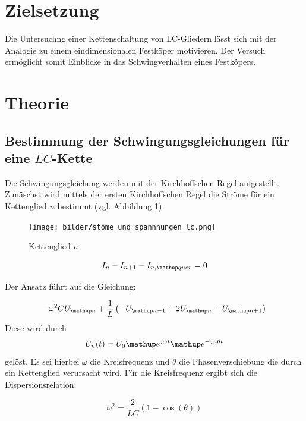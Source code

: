 \setcounter{page}{1}
\section*{Zielsetzung}
Die Untersuchng einer Kettenschaltung von LC-Gliedern lässt sich mit der Analogie  
zu einem eindimensionalen Festköper motivieren.
Der Versuch ermöglicht somit Einblicke in das Schwingverhalten eines 
Festköpers.

\section{Theorie}

\subsection{Bestimmung der Schwingungsgleichungen für eine $LC$-Kette}
Die Schwingungsgleichung werden mit der Kirchhoffschen Regel aufgestellt.
Zunäschst wird mittels der ersten Kirchhoffschen Regel die Ströme für ein Kettenglied $n$ 
bestimmt (vgl. Abbildung \ref{fig:kettenglied}):

\begin{figure}
  \centering
  \texttt{[image: bilder/stöme\_und\_spannnungen\_lc.png]}
  \caption{Kettenglied $n$}
  \label{fig:kettenglied}
\end{figure}

\begin{equation}
\label{eq:kircheins_lc}
I_n-I_{n+1}-I_{n,\map{quer}}=0
\end{equation}

Der Ansatz führt auf die Gleichung:

\begin{equation}
\label{eq:gleichung_lc}
-\omega^2CU\ua{n}+\frac{1}{L}\left(-U\ua{n-1}+2U\ua{n}-U\ua{n+1}\right)
\end{equation}
Diese wird durch 
\begin{equation}
\label{eq:loesung_gleichung_lc}
U_n(t)=U_0 \map{e}^{j\omega t} \map{e}^{-jn\theta t}
\end{equation}
gelöst.
Es sei hierbei $\omega$ die Kreisfrequenz und $\theta$ die Phasenverschiebung 
die durch ein Kettenglied verursacht wird.
Für die Kreisfrequenz ergibt sich die Dispersionsrelation:

\begin{equation}
\label{eq:kreisfrequenz_lc_glied}
\omega^2=\frac{2}{LC}\left(1-\cos(\theta)\right)
\end{equation}

